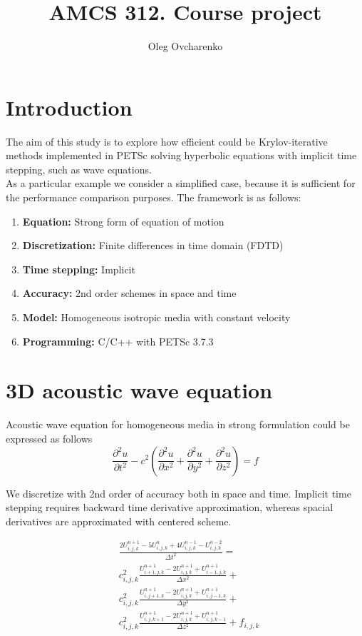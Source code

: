 \documentclass[12pt,a4paper]{report}
\title{AMCS 312. Course project}
\author{Oleg Ovcharenko}
\begin{document}
\maketitle
\section*{Introduction}
The aim of this study is to explore how efficient could be Krylov-iterative methods implemented in PETSc solving hyperbolic equations with implicit time stepping, such as wave equations.\\

As a particular example we consider a simplified case, because it is sufficient for the performance comparison purposes. The framework is as follows:
\begin{enumerate}
\item[] \textbf{Equation:} Strong form of equation of motion
\item[] \textbf{Discretization:} Finite differences in time domain (FDTD)
\item[] \textbf{Time stepping:} Implicit
\item[] \textbf{Accuracy:} 2nd order schemes in space and time
\item[] \textbf{Model:} Homogeneous isotropic media with constant velocity
\item[] \textbf{Programming:} C/C++ with PETSc 3.7.3\\
\end{enumerate} 

\section*{3D acoustic wave equation}
Acoustic wave equation for homogeneous media in strong formulation could be expressed as follows
\begin{equation}
\frac{\partial^2 u}{\partial t^2} - c^2 \left(\frac{\partial^2 u}{\partial x^2} + \frac{\partial^2 u}{\partial y^2} + \frac{\partial^2 u}{\partial z^2}\right) = f
\end{equation}

We discretize with 2nd order of accuracy both in space and time. Implicit time stepping requires backward time derivative approximation, whereas spacial derivatives are approximated with centered scheme.

\begin{equation}
\begin{aligned}
&\frac{2 U^{n+1}_{i,j,k} - 5 U^{n}_{i,j,k} + 4 U^{n-1}_{i,j,k} - U^{n-2}_{i,j,k}}{\Delta t^2} = \\
& c^2_{i,j,k} \frac{U^{n+1}_{i+1,j,k} - 2 U^{n+1}_{i,j,k} + U^{n+1}_{i-1,j,k}}{\Delta x^2} +\\
& c^2_{i,j,k} \frac{U^{n+1}_{i,j+1,k} - 2 U^{n+1}_{i,j,k} + U^{n+1}_{i,j-1,k}}{\Delta y^2} + \\
& c^2_{i,j,k} \frac{U^{n+1}_{i,j,k+1} - 2 U^{n+1}_{i,j,k} + U^{n+1}_{i,j,k-1}}{\Delta z^2} + f_{i,j,k}
\end{aligned}
\end{equation}
\end{document}

